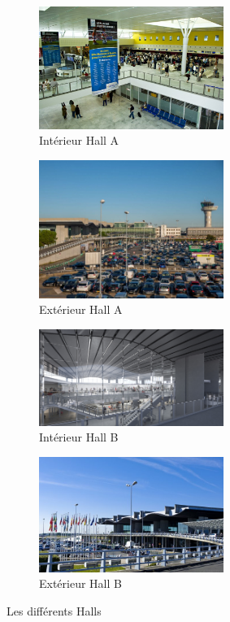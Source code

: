 \begin{figure}[hbt!]
    \begin{subfigure}{0.5\textwidth}
      \centering
      \includegraphics[width=6cm]{Images/inthalla.jpg}  
      \caption{Intérieur Hall A}
      \label{fig:inthalla}
    \end{subfigure}
    \begin{subfigure}{0.5\textwidth}
      \centering
      \includegraphics[width=6cm]{Images/exthalla.jpg}  
      \caption{Extérieur Hall A}
      \label{fig:exthalla}
    \end{subfigure}
        
    \begin{subfigure}{.5\textwidth}
      \centering
      \includegraphics[width=6cm]{Images/inthallb.jpg}  
      \caption{Intérieur Hall B}
      \label{fig:inthallb}
    \end{subfigure}
    \begin{subfigure}{.5\textwidth}
      \centering
      \includegraphics[width=6cm]{Images/exthallb.jpg}  
      \caption{Extérieur Hall B}
      \label{fig:exthallb}
    \end{subfigure}
    \caption{Les différents Halls}
    \label{fig:halls}
\end{figure}

